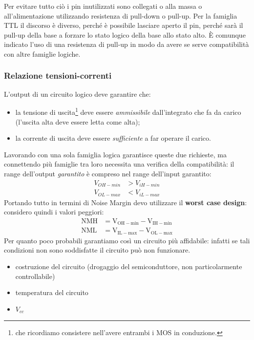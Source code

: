 \documentclass[
]{book}
\providecommand{\tightlist}{%
  \setlength{\itemsep}{0pt}\setlength{\parskip}{0pt}}
\begin{document}
Per evitare tutto ciò i pin inutilizzati sono collegati o alla massa o
all'alimentazione utilizzando resistenza di pull-down o pull-up. Per la
famiglia TTL il discorso è diverso, perché è possibile lasciare aperto
il pin, perché sarà il pull-up della base a forzare lo stato logico
della base allo stato alto. È comunque indicato l'uso di una resistenza
di pull-up in modo da avere se serve compatibilità con altre famiglie
logiche.

\subsubsection{Relazione
tensioni-correnti}\label{relazione-tensioni-correnti}

L'output di un circuito logico deve garantire che:

\begin{itemize}
\tightlist
\item
  la tensione di uscita\footnote{che ricordiamo consistere nell'avere
    entrambi i MOS in conduzione.} deve essere \emph{ammissibile}
  dall'integrato che fa da carico (l'uscita alta deve essere letta come
  alta);
\item
  la corrente di uscita deve essere \emph{sufficiente} a far operare il
  carico.
\end{itemize}

Lavorando con una sola famiglia logica garantisce queste due richieste,
ma connettendo più famiglie tra loro necessita una verifica della
compatibilità: il range dell'output \emph{garantito} è compreso nel
range dell'input garantito: \begin{align*}
V_{OH-min}&>V_{iH-min}\\V_{OL-max}&<V_{iL-max}
\end{align*} Portando tutto in termini di Noise Margin devo utilizzare
il \textbf{worst case design}: considero quindi i valori peggiori:
\begin{align*}
\mathrm{NMH} & =\mathrm{V}_{\mathrm{OH-min}}-\mathrm{V}_{\mathrm{IH-min}} \\
\mathrm{NML} & =\mathrm{V}_{\mathrm{IL-max}}-\mathrm{V}_{\mathrm{OL-max}}
\end{align*} Per quanto poco probabili garantiamo così un circuito più
affidabile: infatti se tali condizioni non sono soddisfatte il circuito
può non funzionare.

\begin{itemize}
\tightlist
\item
  costruzione del circuito (drogaggio del semiconduttore, non
  particolarmente controllabile)
\item
  temperatura del circuito
\item
  \(V_{cc}\)
\end{itemize}
\end{document}
